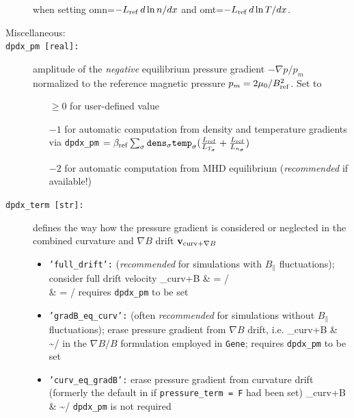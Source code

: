 \documentclass[12pt]{article}
\begin{document}
\begin{description}
  when setting omn=$-L_{{\rm ref}} \, d \ln n/dx$ and omt=$-L_{{\rm ref}} \, d \ln T /dx$.
\item[Miscellaneous:]
\item[\hypertarget{dpdx_pm}{\tt dpdx\_pm [real]:}] amplitude of the {\em negative} equilibrium pressure gradient $-\nabla p/p_m$ 
normalized to the reference magnetic pressure $p_m = 2\mu_0/B_{\rm ref}^2$. Set to 
\begin{itemize}
 \item[$\geq 0$] for user-defined value
 \item[$-1$] for automatic computation from density and temperature gradients via
 \texttt{dpdx\_pm} $=\beta_{\rm ref} \sum_\sigma \texttt{dens}_\sigma {\tt temp}_\sigma (\frac{L_{\rm ref}}{L_{T_\sigma}}+\frac{L_{\rm ref}}{L_{n_\sigma}})$
 \item[$-2$] for automatic computation from MHD equilibrium ({\em recommended} if available!)
\end{itemize}

\item[\hypertarget{dpdx_term}{\tt dpdx\_term [str]:}] defines the way how the pressure gradient is considered or neglected in the 
combined curvature and $\nabla B$ drift $\mathbf{v}_{{\rm curv}+\nabla B}$
\begin{itemize}
 \item {\tt 'full\_drift':} ({\em recommended} for simulations with $B_\|$ fluctuations); consider full drift velocity
 \bea
 _{{\rm curv}+\nabla B} & = \times{}/\Omega \nn \\
 & = \times{}/\Omega \nn
 \eea
 requires {\tt dpdx\_pm} to be set
 \item {\tt 'gradB\_eq\_curv':} (often {\em recommended} for simulations without $B_\|$ fluctuations); erase pressure gradient from $\nabla B$ drift, i.e.
 \bea
 _{{\rm curv}+\nabla B} & \sim {}\times{}/\Omega \nn
 \eea
 in the $\nabla B/B$ formulation employed in {\tt Gene}; requires {\tt dpdx\_pm} to be set
 \item {\tt 'curv\_eq\_gradB':} erase pressure gradient from curvature drift (formerly the default in \gene if {\tt pressure\_term = F} had been set)
 \bea
 _{{\rm curv}+\nabla B} & \sim {}\times{}/\Omega \nn
 \eea
 {\tt dpdx\_pm} is not required
 \end{itemize}


\end{description}
\end{document}
